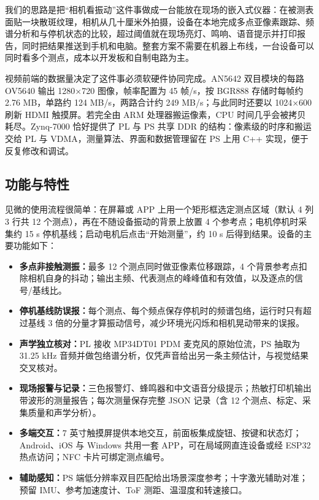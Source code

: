 我们的思路是把“相机看振动”这件事做成一台能放在现场的嵌入式仪器：在被测表面贴一块散斑纹理，相机从几十厘米外拍摄，设备在本地完成多点亚像素跟踪、频谱分析和与停机状态的比较，超过阈值就在现场亮灯、鸣响、语音提示并打印报告，同时把结果推送到手机和电脑。整套方案不需要在机器上布线，一台设备可以同时看多个测点，成本以开发板和自制电路为主。

视频前端的数据量决定了这件事必须软硬件协同完成。AN5642 双目模块的每路 OV5640 输出 1280×720 图像，帧率配置为 45 帧/s，按 BGR888 存储时每帧约 2.76 MB，单路约 124 MB/s，两路合计约 249 MB/s；与此同时还要以 1024×600 刷新 HDMI 触摸屏。若完全由 ARM 处理器搬运像素，CPU 时间几乎会被拷贝耗尽。Zynq-7000 恰好提供了 PL 与 PS 共享 DDR 的结构\cite{ug585}：像素级的时序和搬运交给 PL 与 VDMA\cite{pg020}，测量算法、界面和数据管理留在 PS 上用 C++ 实现，便于反复修改和调试。

\subsection{功能与特性}

见微的使用流程很简单：在屏幕或 APP 上用一个矩形框选定测点区域（默认 4 列 3 行共 12 个测点），再在不随设备振动的背景上放置 4 个参考点；电机停机时采集约 15 s 停机基线；启动电机后点击“开始测量”，约 10 s 后得到结果。设备的主要功能如下：

\begin{itemize}
\item \textbf{多点非接触测振：}最多 12 个测点同时做亚像素位移跟踪，4 个背景参考点扣除相机自身的抖动；输出主频、代表测点的峰峰值和有效值，以及逐点的信号/基线比。
\item \textbf{停机基线防误报：}每个测点、每个频点保存停机时的频谱包络，运行时只有超过基线 3 倍的分量才算振动信号，减少环境光闪烁和相机晃动带来的误报。
\item \textbf{声学独立核对：}PL 接收 MP34DT01 PDM 麦克风的原始位流，PS 抽取为 31.25 kHz 音频并做包络谱分析，仅凭声音给出另一条主频估计，与视觉结果交叉核对。
\item \textbf{现场报警与记录：}三色报警灯、蜂鸣器和中文语音分级提示；热敏打印机输出带波形的测量报告；每次测量保存完整 JSON 记录（含 12 个测点、标定、采集质量和声学分析）。
\item \textbf{多端交互：}7 英寸触摸屏提供本地交互，前面板集成旋钮、按键和状态灯；Android、iOS 与 Windows 共用一套 APP，可在局域网直连设备或经 ESP32 热点访问；NFC 卡片可绑定测点编号。
\item \textbf{辅助感知：}PS 端低分辨率双目匹配给出场景深度参考；十字激光辅助对准；预留 IMU、参考加速度计、ToF 测距、温湿度和转速接口。
\end{itemize}

